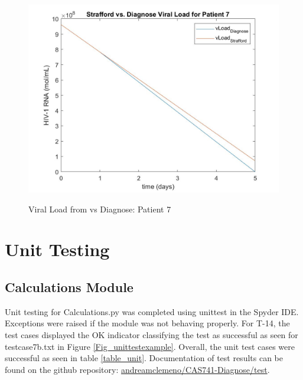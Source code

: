 \documentclass[12pt, titlepage]{article}
\begin{document}
\begin{figure}[h!]
 \begin{center}
 {
  \includegraphics[width=1\textwidth]{graphexample.jpg}
 }
 \caption{Viral Load from \citet{Stafford2000} vs  Diagnose: Patient 7}

 \label{Fig_graphexample}
 \end{center}
 \end{figure}



\section{Unit Testing}\label{unittesting}

\subsection{Calculations Module}

Unit testing for Calculations.py was completed using unittest in the Spyder IDE. 
Exceptions were raised if the module was not behaving properly. For T-14, the 
test cases displayed the OK indicator classifying the test as successful as seen 
for testcase7b.txt in Figure \ref{Fig_unittestexample}. Overall, the unit test 
cases were successful as seen in table \ref{table_unit}. Documentation of test 
results can be found on the github repository: 
\href{https://github.com/andreamclemeno/CAS741-Diagnose/tree/master/test}{andreamclemeno/CAS741-Diagnose/test}.
\end{document}
